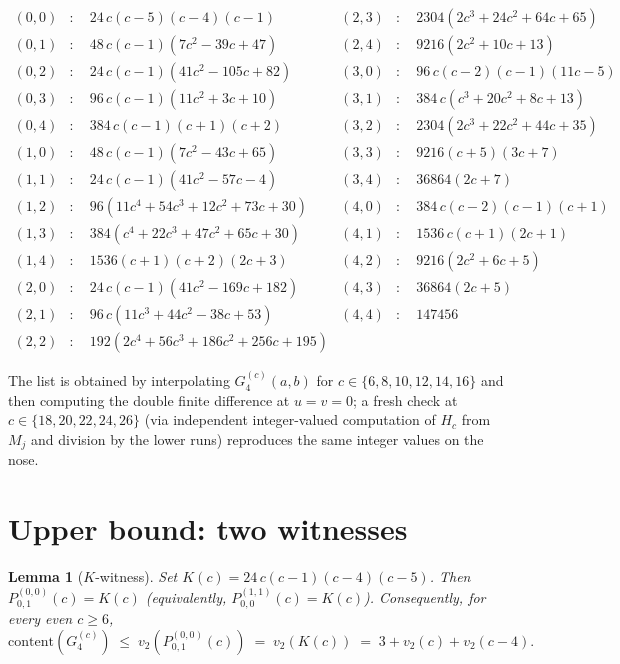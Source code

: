 \documentclass[11pt]{article}
\newtheorem{lemma}[theorem]{Lemma}
\begin{document}
\begin{small}
\begin{align*}
(0,0)&: \quad 24\,c(c{-}5)(c{-}4)(c{-}1) & (2,3)&: \quad 2304(2c^3 + 24c^2 + 64c + 65)\\
(0,1)&: \quad 48\,c(c{-}1)(7c^2 - 39c + 47) & (2,4)&: \quad 9216(2c^2 + 10c + 13)\\
(0,2)&: \quad 24\,c(c{-}1)(41c^2 - 105c + 82) & (3,0)&: \quad 96\,c(c{-}2)(c{-}1)(11c - 5)\\
(0,3)&: \quad 96\,c(c{-}1)(11c^2 + 3c + 10) & (3,1)&: \quad 384\,c(c^3 + 20c^2 + 8c + 13)\\
(0,4)&: \quad 384\,c(c{-}1)(c{+}1)(c{+}2) & (3,2)&: \quad 2304(2c^3 + 22c^2 + 44c + 35)\\
(1,0)&: \quad 48\,c(c{-}1)(7c^2 - 43c + 65) & (3,3)&: \quad 9216(c{+}5)(3c + 7)\\
(1,1)&: \quad 24\,c(c{-}1)(41c^2 - 57c - 4) & (3,4)&: \quad 36864(2c + 7)\\
(1,2)&: \quad 96(11c^4 + 54c^3 + 12c^2 + 73c + 30) & (4,0)&: \quad 384\,c(c{-}2)(c{-}1)(c{+}1)\\
(1,3)&: \quad 384(c^4 + 22c^3 + 47c^2 + 65c + 30) & (4,1)&: \quad 1536\,c(c{+}1)(2c + 1)\\
(1,4)&: \quad 1536(c{+}1)(c{+}2)(2c + 3) & (4,2)&: \quad 9216(2c^2 + 6c + 5)\\
(2,0)&: \quad 24\,c(c{-}1)(41c^2 - 169c + 182) & (4,3)&: \quad 36864(2c + 5)\\
(2,1)&: \quad 96\,c(11c^3 + 44c^2 - 38c + 53) & (4,4)&: \quad 147456\\
(2,2)&: \quad 192(2c^4 + 56c^3 + 186c^2 + 256c + 195) & &
\end{align*}
\end{small}

The list is obtained by interpolating $G_4^{(c)}(a,b)$ for $c \in \{6, 8, 10, 12, 14, 16\}$
and then computing the double finite difference at $u = v = 0$; a fresh check at
$c \in \{18, 20, 22, 24, 26\}$ (via independent integer-valued computation of $H_c$ from
$M_j$ and division by the lower runs) reproduces the same integer values on the nose.

\section{Upper bound: two witnesses}\label{sec:upper}

\begin{lemma}[$K$-witness]\label{lem:K-witness}
Set $K(c) = 24\,c(c-1)(c-4)(c-5)$. Then $P^{(0,0)}_{0,1}(c) = K(c)$
(equivalently, $P^{(1,1)}_{0,0}(c) = K(c)$). Consequently, for every even $c \ge 6$,
\[
  \mathrm{content}(G_4^{(c)}) \;\le\; v_2(P^{(0,0)}_{0,1}(c)) \;=\; v_2(K(c)) \;=\; 3 + v_2(c) + v_2(c-4).
\]
\end{lemma}
\end{document}
